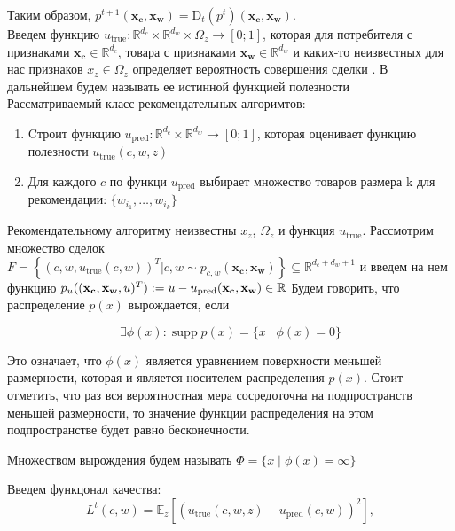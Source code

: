 \documentclass{article}
\DeclareMathOperator\supp{supp}
\begin{document}
Таким образом, $p^{t + 1}(\mathbf{x_c}, \mathbf{x_w}) = \text{D}_t(p^{t})(\mathbf{x_c}, \mathbf{x_w})$.\\
\hspace*{10px}Введем функцию $u_{\text{true}}: \mathbb{R}^{d_c} \times \mathbb{R}^{d_w} \times \Omega_z \to [0; 1]$, которая для потребителя с признаками $\mathbf{x_c} \in \mathbb{R}^{d_c}$, товара с признаками $\mathbf{x_w} \in \mathbb{R}^{d_w}$ и каких-то неизвестных для нас признаков $x_z \in \Omega_z$ определяет вероятность совершения сделки . В дальнейшем будем называть ее истинной функцией полезности\\
Рассматриваемый класс рекомендательных алгоримтов:
\begin{enumerate}
    \item  Cтроит функцию $u_{\text{pred}}: \mathbb{R}^{d_c} \times \mathbb{R}^{d_w} \to [0; 1]$, которая оценивает функцию полезности $u_{\text{true}}(c, w, z)$
    \item Для каждого $c$ по функци $u_{\text{pred}}$ выбирает множество товаров размера k для рекомендации: $\{w_{i_1},\ldots, w_{i_k}\}$
\end{enumerate}

Рекомендательному алгоритму неизвестны $x_z$, $\Omega_z$ и функция $u_{\text{true}}$. 
Рассмотрим множество сделок $F =  \left\{(c, w, u_{\text{true}}(c, w))^T | c, w \sim p_{c, w}(\mathbf{x_c}, \mathbf{x_w})\right\} \subseteq \mathbb{R}^{d_c + d_w + 1}$ и введем на нем функцию $p_u((\mathbf{x_c}, \mathbf{x_w}, u)^T) := u - u_{\text{pred}}(\mathbf{x_c}, \mathbf{x_w}) \in \mathbb{R} \\$
\hspace*{10px}Будем говорить, что распределение $p(x)$ вырождается, если 

$$
\exists \phi(x) : \supp p(x) = \{x \; |\; \phi(x) = 0\}
$$

Это означает, что $\phi(x)$ является уравнением поверхности меньшей размерности, которая и является носителем распределения $p(x)$. Стоит отметить, что раз вся вероятностная мера сосредоточна на подпространств меньшей размерности, то значение функции распределения на этом подпространстве будет равно бесконечности.

Множеством вырождения будем называть $\Phi = \{x \; |\; \phi(x) = \infty\}$

Введем функцонал качества:
            $$L^t(c, w) = \mathbb{E}_z[(u_{\text{true}}(c, w, z) - u_{\text{pred}}(c, w))^2],$$
\end{document}
